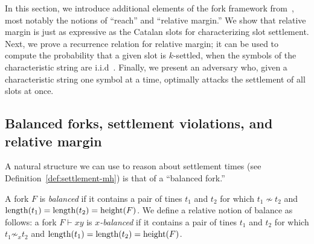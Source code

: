 In this section, we introduce additional elements of the fork framework from~\citet{LinearConsistency}, 
most notably the notions of ``reach'' and ``relative margin.'' 
We show that relative margin is just as expressive 
as the Catalan slots 
for characterizing slot settlement. 
Next, we prove a recurrence relation for relative margin; 
it can be used to compute 
the probability that a given slot is $k$-settled, 
when the symbols of the characteristic string are i.i.d\ .
Finally, we present an adversary who, 
given a characteristic string one symbol at a time, 
optimally attacks the settlement of all slots at once. 









\subsection{Balanced forks, settlement violations, and relative margin}

A natural structure we can use to reason about settlement times 
(see Definition~\ref{def:settlement-mh}) 
is that of a ``balanced fork.''

\begin{definition}\label{def:balanced-fork} A
  fork $F$ is \emph{balanced} if it contains a pair of tines $t_1$ and
  $t_2$ for which $t_1\nsim t_2$ and
  $\operatorname{length}(t_1)=\operatorname{length}(t_2)=\operatorname{height}(F)$. We define a relative notion
  of balance as follows: a fork $F \vdash xy$ is \emph{$x$-balanced}
  if it contains a pair of tines $t_1$ and $t_2$ for which
  $t_1 \not\sim_x t_2$ and $\operatorname{length}(t_1) = \operatorname{length}(t_2) = \operatorname{height}(F)$.
\end{definition}

